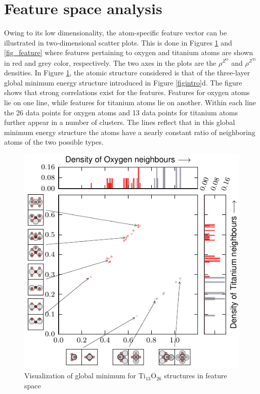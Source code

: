 \documentclass[aip,amsmath,amssymb,reprint]{revtex4-1}
\begin{document}
\section{Feature space analysis}

Owing to its low dimensionality, the atom-specific feature vector can
be illustrated in two-dimensional scatter plots. This is done in
Figures \ref{fig_global} and \ref{fig_feature} where features
pertaining to oxygen and titanium atoms are shown in red and grey
color, respectively.  The two axes in the plots are the
$\rho^{Z^\mathrm{O}}$ and $\rho^{Z^\mathrm{Ti}}$ densities.  In
Figure \ref{fig_global}, the atomic structure considered is that of the
three-layer global minimum energy structure introduced in
Figure \ref{figintro}d. The figure shows that strong correlations exist
for the features. Features for oxygen atoms lie on one line, while
features for titanium atoms lie on another. Within each line the 26
data points for oxygen atoms and 13 data points for titanium atoms
further appear in a number of clusters. The lines reflect that in this
global minimum energy structure the atoms have a nearly constant
ratio of neighboring atoms of the two possible types.

\begin{figure}[tb]
    \centering
    \includegraphics[width=1.0\columnwidth]{fig2-gm_scatterplot.pdf}
    \caption{Visualization of global minimum for Ti$_{13}$O$_{26}$ structures in feature space}   
    \label{fig_global}
\end{figure}
\end{document}
